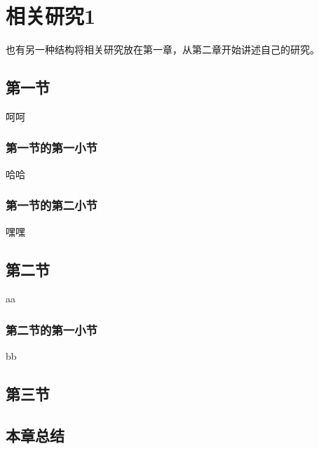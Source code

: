 
\chapter{相关研究1}

也有另一种结构将相关研究放在第一章，从第二章开始讲述自己的研究。

\section{第一节}

呵呵

\subsection{第一节的第一小节}

哈哈

\subsection{第一节的第二小节}

嘿嘿

\section{第二节}

aa

\subsection{第二节的第一小节}

bb

\section{第三节}

\section{本章总结}

\ifprint
	\newpage
	\thispagestyle{empty}
	\mbox{}
	
	\clearpage
	\setcounter{page}{10}
\fi